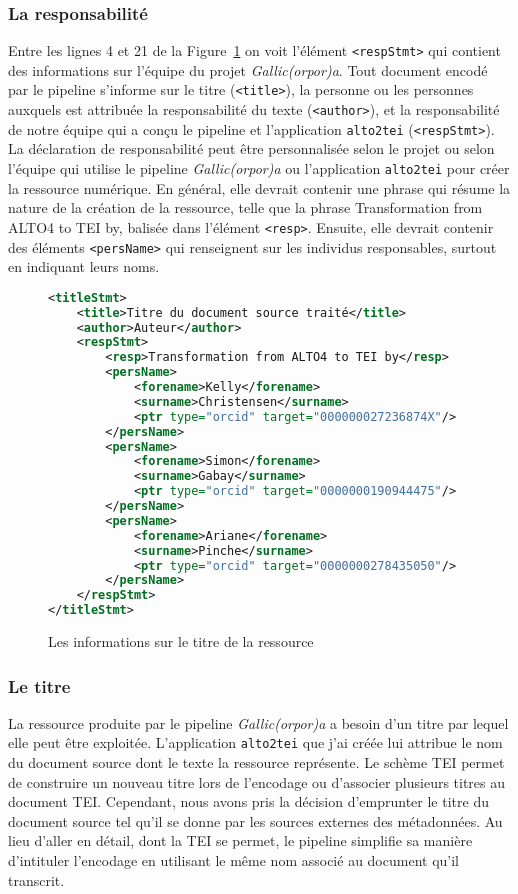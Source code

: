 \documentclass[class=article, crop=false]{standalone}
\begin{document}
\subsubsection{La responsabilité}
Entre les lignes 4 et 21 de la Figure~\ref{fig:titleStmt} on voit l'élément \texttt{<respStmt>} qui contient des informations sur l'équipe du projet \textit{Gallic(orpor)a}. Tout document encodé par le pipeline s'informe sur le titre (\texttt{<title>}), la personne ou les personnes auxquels est attribuée la responsabilité du texte (\texttt{<author>}), et la responsabilité de notre équipe qui a conçu le pipeline et l'application \texttt{alto2tei} (\texttt{<respStmt>}). La déclaration de responsabilité peut être personnalisée selon le projet ou selon l'équipe qui utilise le pipeline \textit{Gallic(orpor)a} ou l'application \texttt{alto2tei} pour créer la ressource numérique. En général, elle devrait contenir une phrase qui résume la nature de la création de la ressource, telle que la phrase \og{}Transformation from ALTO4 to TEI by\fg{}, balisée dans l'élément \texttt{<resp>}. Ensuite, elle devrait contenir des éléments \texttt{<persName>} qui renseignent sur les individus responsables, surtout en indiquant leurs noms.

\begin{figure}[htp]
\centering
\begin{lstlisting}[language=XML]
<titleStmt>
	<title>Titre du document source traité</title>
	<author>Auteur</author>
	<respStmt>
		<resp>Transformation from ALTO4 to TEI by</resp>
		<persName>
			<forename>Kelly</forename>
			<surname>Christensen</surname>
			<ptr type="orcid" target="000000027236874X"/>
		</persName>
		<persName>
			<forename>Simon</forename>
			<surname>Gabay</surname>
			<ptr type="orcid" target="0000000190944475"/>
		</persName>
		<persName>
			<forename>Ariane</forename>
			<surname>Pinche</surname>
			<ptr type="orcid" target="0000000278435050"/>
		</persName>
	</respStmt>
</titleStmt>
\end{lstlisting}
\caption{Les informations sur le titre de la ressource}
\label{fig:titleStmt}
\end{figure}

\subsubsection{Le titre}
La ressource produite par le pipeline \textit{Gallic(orpor)a} a besoin d'un titre par lequel elle peut être exploitée. L'application \texttt{alto2tei} que j'ai créée lui attribue le nom du document source dont le texte la ressource représente. Le schème \acrshort{TEI} permet de construire un nouveau titre lors de l'encodage ou d'associer plusieurs titres au document \acrshort{TEI}. Cependant, nous avons pris la décision d'emprunter le titre du document source tel qu'il se donne par les sources externes des métadonnées. Au lieu d'aller en détail, dont la \acrshort{TEI} se permet, le pipeline simplifie sa manière d'intituler l'encodage en utilisant le même nom associé au document qu'il transcrit.
\end{document}
